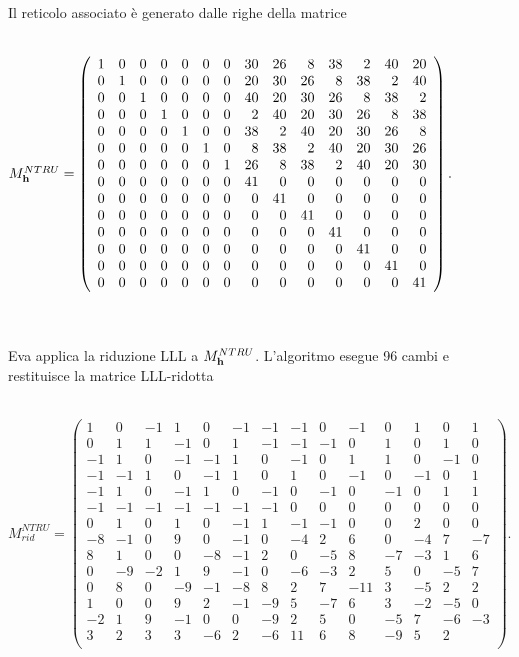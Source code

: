 \documentclass[a4paper,12pt]{report}
\theoremstyle{plain}
\theoremstyle{definition}
\theoremstyle{remark}
\begin{document}
Il reticolo associato \` e generato dalle righe della matrice \\ \\ \centerline{
$     M_{\textbf h}^{NTRU}=                             
\left(
\begin{array} {rrrrrrrrrrrrrr} 
1&0&0&0&0&0&0&30&26&8&38&2&40&20 \\
0&1&0&0&0&0&0&20&30&26&8&38&2&40 \\
0&0&1&0&0&0&0&40&20&30&26&8&38&2 \\
0&0&0&1&0&0&0&2&40&20&30&26&8&38 \\
0&0&0&0&1&0&0&38&2&40&20&30&26&8 \\ 
0&0&0&0&0&1&0&8&38&2&40&20&30&26 \\
0&0&0&0&0&0&1&26&8&38&2&40&20&30 \\
0&0&0&0&0&0&0&41&0&0&0&0&0&0\\
0&0&0&0&0&0&0&0&41&0&0&0&0&0\\
0&0&0&0&0&0&0&0&0&41&0&0&0&0\\
0&0&0&0&0&0&0&0&0&0&41&0&0&0\\
0&0&0&0&0&0&0&0&0&0&0&41&0&0\\
0&0&0&0&0&0&0&0&0&0&0&0&41&0\\
0&0&0&0&0&0&0&0&0&0&0&0&0&41\\
 \end{array}\right).
$}
\\ \\  
Eva applica la riduzione LLL a $     M_{\textbf h}^{NTRU}$. L'algoritmo esegue 96 cambi e restituisce la matrice LLL-ridotta\\ \\ \centerline{
$     M_{rid}^{NTRU}=                             
\left(
\begin{array} {rrrrrrrrrrrrrr} 
1&0&-1&1&0&-1&-1&-1&0&-1&0&1&0&1\\ 
0&1&1&-1&0&1&-1&-1&-1&0&1&0&1&0 \\
-1&1&0&-1&-1&1&0&-1&0&1&1&0&-1&0 \\
-1&-1&1&0&-1&1&0&1&0&-1&0&-1&0&1 \\
-1&1&0&-1&1&0&-1&0&-1&0&-1&0&1&1 \\
-1&-1&-1&-1&-1&-1&-1&0&0&0&0&0&0&0 \\
0&1&0&1&0&-1&1&-1&-1&0&0&2&0&0\\
-8&-1&0&9&0&-1&0&-4&2&6&0&-4&7&-7\\
8&1&0&0&-8&-1&2&0&-5&8&-7&-3&1&6 \\
0&-9&-2&1&9&-1&0&-6&-3&2&5&0&-5&7\\
0&8&0&-9&-1&-8&8&2&7&-11&3&-5&2&2\\
1&0&0&9&2&-1&-9&5&-7&6&3&-2&-5&0\\ 
-2&1&9&-1&0&0&-9&2&5&0&-5&7&-6&-3\\
3&2&3&3&-6&2&-6&11&6&8&-9&5&2\\
\end{array}\right).
$}
\end{document}
